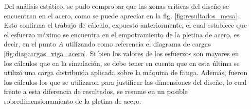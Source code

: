 Del análisis estático, se pudo comprobar que las zonas críticas del diseño se encuentran en el acero, como se puede apreciar en la fig. \ref{fig:resultados_mesa}. Esto confirma el trabajo de cálculo, expuesto anteriormente, el cual establece que el esfuerzo máximo se encuentra en el empotramiento de la pletina de acero, es decir, en el punto $A$ utilizando como referencia el diagrama de cargas \ref{fig:diagcargas_viga_acero}. Si bien los valores de los esfuerzos son mayores en los cálculos que en la simulación, se debe tener en cuenta que en esta última se utilizó una carga distribuida aplicada sobre la máquina de fatiga. Además, fueron los cálculos los que se utilizaron para justificar las dimensiones del diseño, lo cual frente a esta diferencia de resultados, se resume en un posible sobredimensionamiento de la pletina de acero.

